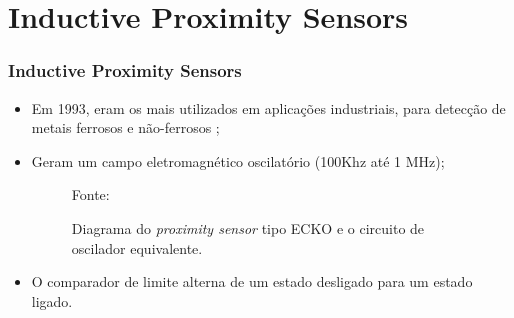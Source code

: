 \documentclass[xcolor=dvipsnames, aspectratio=169]{beamer}
\begin{document}
\section[Inductive Proximity Sensors]{Inductive Proximity Sensors} 
\begin{frame}
\frametitle{Inductive Proximity Sensors}
	\begin{itemize}
		\item Em 1993, eram os mais utilizados em aplicações industriais, para detecção de metais ferrosos e não-ferrosos \cite{everett1995sensors};
		\item Geram um campo eletromagnético oscilatório (100Khz até 1 MHz);
		\begin{figure}
			\centering
			{Fonte: \cite{everett1995sensors}}
			\caption{Diagrama do \textit{proximity sensor} tipo ECKO e o circuito de oscilador equivalente.}
			\label{fig:3_diagram_proximity_sensor}
		\end{figure}
		\newpage
		\item O comparador de limite alterna de um estado desligado para um estado ligado.
		\begin{figure}
			\centering

\end{figure}
\end{itemize}
\end{frame}
\end{document}
